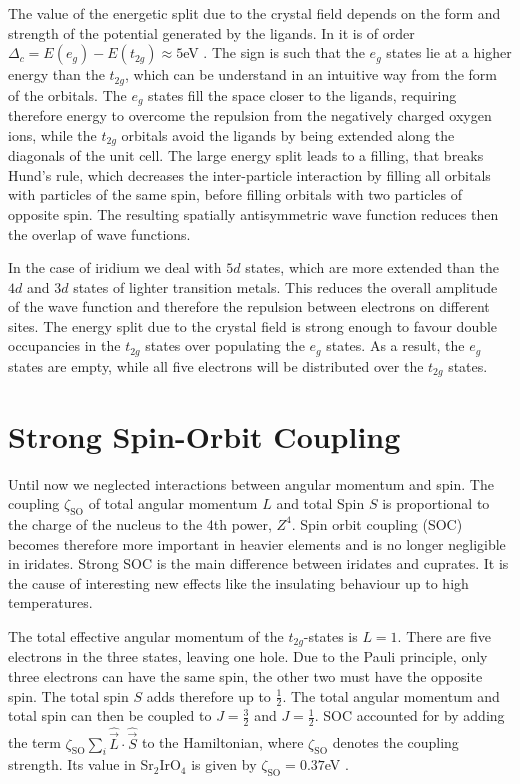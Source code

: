 The value of the energetic split due to the crystal field depends on the form and strength of the potential generated by the ligands. 
In \Sriro  it is of order $\Delta_c  = E(e_g) - E(t_{2g})\approx 5$eV \cite{PhysRevB.80.075112}. 
The sign is such that the $e_g$ states lie at a  higher energy than the $t_{2g}$,
which can be understand in an intuitive way from the form of the orbitals.
The $e_g$ states fill the space closer to the ligands, requiring therefore 
energy to overcome the repulsion from the negatively charged oxygen ions,
while the $t_{2g}$ orbitals avoid the ligands by being extended along the diagonals of the unit cell. 
The large energy split leads to a filling, that breaks Hund's rule,
which decreases the inter-particle interaction by filling all orbitals with particles of the same spin,
before filling orbitals with two particles of opposite spin. 
The resulting spatially antisymmetric wave function reduces then the overlap of wave functions.

In the case of iridium we deal with  $5d$ states, which are more extended than the $4d$ and $3d$ states of lighter transition metals. 
This reduces the overall amplitude of the wave function and therefore  the repulsion between electrons on different sites. 
The energy split due to the crystal field is strong enough to favour double occupancies in the $t_{2g}$ states over populating the $e_g$ states. 
As a result, the $e_g$ states are empty, while all five electrons will be distributed over the $t_{2g}$ states. 





\section{Strong Spin-Orbit Coupling}


Until now we neglected interactions between angular momentum and spin. 
The coupling $\zeta_{\mathrm{SO}}$ of total angular momentum $L$ and total Spin $S$ is proportional to the charge of the nucleus to the 4th power, $Z^4$.
Spin orbit coupling (SOC) becomes therefore more important in heavier elements and is no longer negligible in iridates.
Strong SOC is the main difference between iridates and cuprates.
It is the cause of interesting new effects like the insulating behaviour up to high temperatures. 

The total effective angular momentum of the $t_{2g}$-states is $L=1$. 
There are five electrons in the three states, leaving one hole.
Due to the Pauli principle, only three electrons can have the same spin, 
the other two must have the opposite spin. 
The total spin $S$ adds therefore up to $\frac12$.
The total angular momentum and total spin can then be coupled to
$J=\frac32$ and $J=\frac12$.
%
SOC accounted for by adding the term $\zeta_{\mathrm{SO}} \sum_{i} \hat{\vec L} \cdot \hat{\vec S}$ to the Hamiltonian,
where $\zeta_{\mathrm{SO}}$ denotes the coupling strength. 
Its value in Sr$_2$IrO$_4$ is given by $\zeta_{\mathrm{SO}} = 0.37$eV \cite{PhysRevLett.105.216410}.

